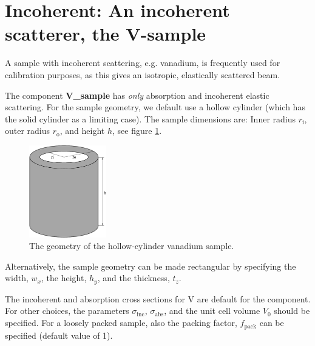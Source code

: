 \section{Incoherent: An incoherent scatterer, the V-sample}
\label{s:v_sample}



A sample with incoherent scattering, e.g. vanadium, is frequently used for
calibration purposes, as this gives an isotropic, elastically scattered beam.

The component \textbf{V\_sample}
has {\em only} absorption and incoherent elastic scattering.
For the sample geometry, we default use a
hollow cylinder (which has the solid cylinder as a limiting case).
The sample dimensions are: Inner radius $r_\textrm{i}$,
outer radius $r_\textrm{o}$, and height $h$, see figure \ref{f:v-sample}.
\begin{figure}
  \begin{center}
    \includegraphics[width=0.3\textwidth]{figures/vsample}
  \end{center}
\caption{The geometry of the hollow-cylinder vanadium sample.}
\label{f:v-sample}
\end{figure}

Alternatively, the sample geometry can be made rectangular
by specifying the width, $w_x$, the height, $h_y$, and the thickness, $t_z$.

The incoherent and absorption cross sections for V are default
for the component. For other choices, the
parameters $\sigma_\textrm{inc}$, $\sigma_\textrm{abs}$,
and the unit cell volume $V_0$ should be specified.
For a loosely packed sample, also the packing factor, $f_\textrm{pack}$
can be specified (default value of 1).

